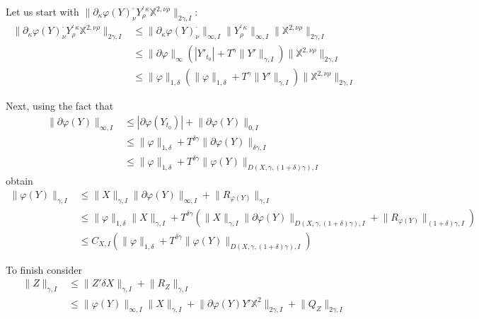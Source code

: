 \documentclass[a4paper,12pt,reqno]{amsproc}
\newcommand{\der}{\delta\!}
\newcommand{\XX}{\mathbb{X}}
\newcommand{\norm}[1]{\lVert #1\rVert}
\begin{document}
Let us start with $\norm{\partial_\kappa \varphi(Y)^{\cdot}_{\nu}
 Y^{\prime\,\kappa}_{\rho} \XX^{2,\nu\rho}}_{2\gamma,I}$: 
\begin{equation}
\label{eq:zbound-part1}
  \begin{split}
  \norm{\partial_\kappa \varphi(Y)^{\cdot}_{\nu}
 Y^{\prime\,\kappa}_{\rho} \XX^{2,\nu\rho}}_{2\gamma,I} & \le
 \norm{\partial_\kappa \varphi(Y)^{\cdot}_{\nu}}_{\infty,I}
 \norm{Y^{\prime\,\kappa}_{\rho}}_{\infty,I}
 \norm{\XX^{2,\nu\rho}}_{2\gamma,I} 
\\ & \le \norm{\partial
 \varphi}_{\infty}(|Y'_{t_0}|+T^{\gamma}\norm{Y'}_{\gamma,I})
 \norm{\XX^{2,\nu\rho}}_{2\gamma,I} 
\\ & \le \norm{
 \varphi}_{1,\delta}(\norm{\varphi}_{1,\delta}+T^{\gamma}\norm{Y'}_{\gamma,I})
 \norm{\XX^{2,\nu\rho}}_{2\gamma,I} 
  \end{split}
\end{equation}

Next, using the fact that 
\begin{equation*}
  \begin{split}
\norm{\partial \varphi(Y)}_{\infty,I}& \le |\partial \varphi(Y_{t_0})|+
\norm{\partial \varphi(Y)}_{0,I} 
\\ & \le \norm{\varphi}_{1,\delta} +
T^{\delta\gamma} \norm{\partial \varphi(Y)}_{\delta\gamma,I}
\\ & \le \norm{\varphi}_{1,\delta} +
T^{\delta\gamma} \norm{ \varphi(Y)}_{D(X,\gamma,(1+\delta)\gamma),I}    
  \end{split}
\end{equation*}
obtain 
\begin{equation}
\label{eq:zbound-part2}
  \begin{split}
 \norm{\varphi(Y)}_{\gamma,I} & \le 
\|X\|_{\gamma,I} \norm{\partial \varphi(Y)}_{\infty,I} +
\norm{R_{\varphi(Y)}}_{\gamma,I}  
\\ & \le \norm{\varphi}_{1,\delta}\|X\|_{\gamma,I} +T^{\delta\gamma} (\|X\|_{\gamma,I} \norm{\partial \varphi(Y)}_{D(X,\gamma,(1+\delta)\gamma),I} +
 \norm{R_{\varphi(Y)}}_{(1+\delta)\gamma,I}  ) 
\\ & \le C_{X,I} (\norm{\varphi}_{1,\delta} + T^{\delta\gamma} \norm{\varphi(Y)}_{D(X,\gamma,(1+\delta)\gamma),I}  )
    \end{split}
\end{equation}

To finish consider
\begin{equation}
\label{eq:zbound-part3}
  \begin{split}
 \norm{Z}_{\gamma,I} & \le \norm{Z'\der X}_{\gamma,I} +
 \norm{R_Z}_{\gamma,I} 
   \\ & \le \norm{ \varphi(Y)}_{\infty,I} \norm{X}_{\gamma,I}
 + \norm{\partial \varphi(Y) Y' \mathbb{X}^2}_{2\gamma,I} + \norm{Q_Z}_{2\gamma,I}
  \end{split}
\end{equation}
\end{document}
